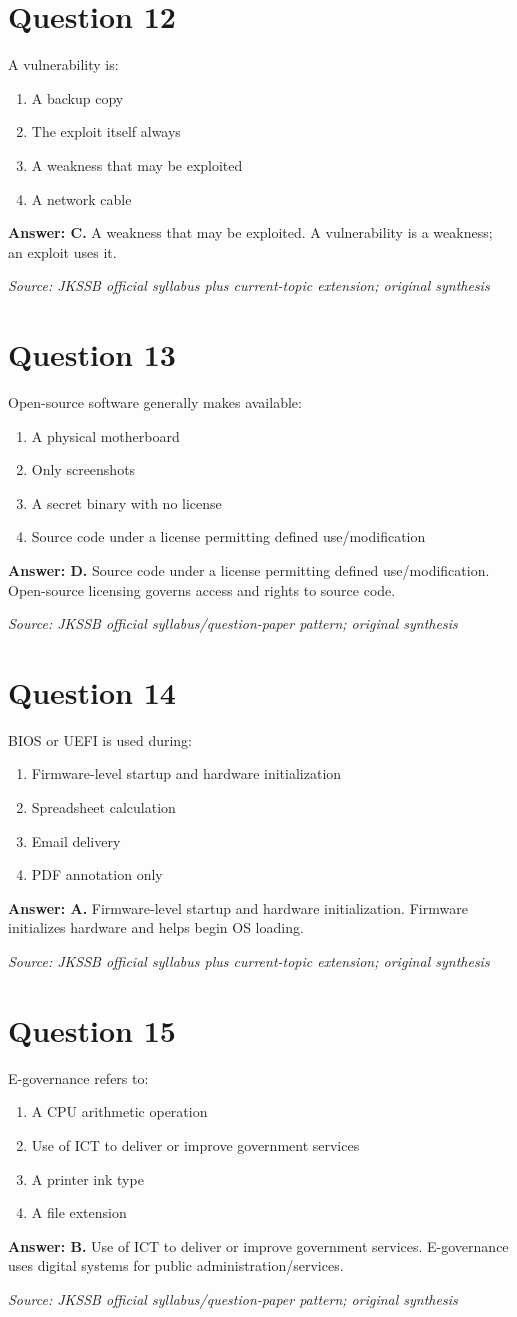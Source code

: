 \documentclass[11pt,a4paper]{book}
\newcommand{\source}[1]{\par\smallskip\textit{Source: #1}}
\newcommand{\answer}[2]{\par\textbf{Answer: #1.} #2}
\begin{document}
\section*{Question 12}
A vulnerability is:
\begin{enumerate}[label=\Alph*.]
\item A backup copy
\item The exploit itself always
\item A weakness that may be exploited
\item A network cable
\end{enumerate}
\answer{C}{A weakness that may be exploited. A vulnerability is a weakness; an exploit uses it.}
\source{JKSSB official syllabus plus current-topic extension; original synthesis}
\section*{Question 13}
Open-source software generally makes available:
\begin{enumerate}[label=\Alph*.]
\item A physical motherboard
\item Only screenshots
\item A secret binary with no license
\item Source code under a license permitting defined use/modification
\end{enumerate}
\answer{D}{Source code under a license permitting defined use/modification. Open-source licensing governs access and rights to source code.}
\source{JKSSB official syllabus/question-paper pattern; original synthesis}
\section*{Question 14}
BIOS or UEFI is used during:
\begin{enumerate}[label=\Alph*.]
\item Firmware-level startup and hardware initialization
\item Spreadsheet calculation
\item Email delivery
\item PDF annotation only
\end{enumerate}
\answer{A}{Firmware-level startup and hardware initialization. Firmware initializes hardware and helps begin OS loading.}
\source{JKSSB official syllabus plus current-topic extension; original synthesis}
\section*{Question 15}
E-governance refers to:
\begin{enumerate}[label=\Alph*.]
\item A CPU arithmetic operation
\item Use of ICT to deliver or improve government services
\item A printer ink type
\item A file extension
\end{enumerate}
\answer{B}{Use of ICT to deliver or improve government services. E-governance uses digital systems for public administration/services.}
\source{JKSSB official syllabus/question-paper pattern; original synthesis}
\end{document}
